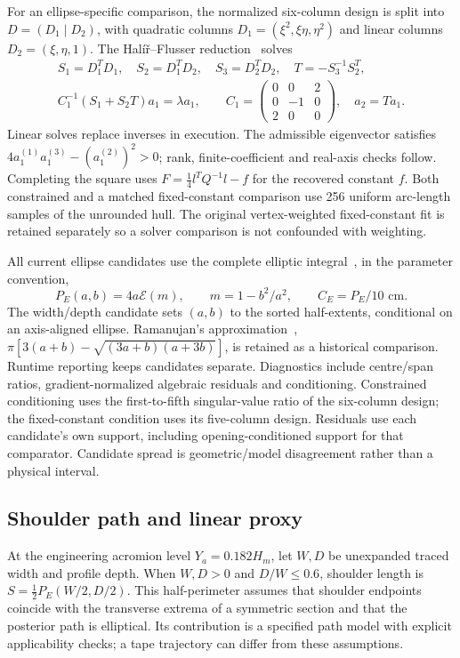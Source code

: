 \documentclass[11pt,a4paper]{article}
\begin{document}
For an ellipse-specific comparison, the normalized six-column design is split into $D=(D_1\mid D_2)$, with quadratic columns $D_1=(\xi^2,\xi\eta,\eta^2)$ and linear columns $D_2=(\xi,\eta,1)$. The Hal\'i\v r--Flusser reduction~\cite{halir1998} solves
\begin{equation}
\begin{gathered}
 S_1=D_1^TD_1,\quad S_2=D_1^TD_2,\quad S_3=D_2^TD_2,\quad
 T=-S_3^{-1}S_2^T,\\
 C_1^{-1}(S_1+S_2T)a_1=\lambda a_1,\qquad
 C_1=\begin{pmatrix}0&0&2\\0&-1&0\\2&0&0\end{pmatrix},\quad a_2=Ta_1.
\end{gathered}
\label{eq:constrained}
\end{equation}
Linear solves replace inverses in execution. The admissible eigenvector satisfies $4a_1^{(1)}a_1^{(3)}-(a_1^{(2)})^2>0$; rank, finite-coefficient and real-axis checks follow. Completing the square uses $F=\tfrac14l^TQ^{-1}l-f$ for the recovered constant $f$. Both constrained and a matched fixed-constant comparison use 256 uniform arc-length samples of the unrounded hull. The original vertex-weighted fixed-constant fit is retained separately so a solver comparison is not confounded with weighting.

All current ellipse candidates use the complete elliptic integral~\cite{dlmfelliptic}, in the parameter convention,
\begin{equation}
 P_E(a,b)=4a\mathcal E(m),\qquad m=1-b^2/a^2,\qquad C_E=P_E/10\text{ cm}.
 \label{eq:perimeter}
\end{equation}
The width/depth candidate sets $(a,b)$ to the sorted half-extents, conditional on an axis-aligned ellipse. Ramanujan's approximation~\cite{ramanujan1914modular}, $\pi[3(a+b)-\sqrt{(3a+b)(a+3b)}]$, is retained as a historical comparison. Runtime reporting keeps candidates separate. Diagnostics include centre/span ratios, gradient-normalized algebraic residuals and conditioning. Constrained conditioning uses the first-to-fifth singular-value ratio of the six-column design; the fixed-constant condition uses its five-column design. Residuals use each candidate's own support, including opening-conditioned support for that comparator. Candidate spread is geometric/model disagreement rather than a physical interval.

\subsection{Shoulder path and linear proxy}
At the engineering acromion level $Y_a=0.182H_m$, let $W,D$ be unexpanded traced width and profile depth. When $W,D>0$ and $D/W\leq0.6$, shoulder length is $S=\tfrac12P_E(W/2,D/2)$. This half-perimeter assumes that shoulder endpoints coincide with the transverse extrema of a symmetric section and that the posterior path is elliptical. Its contribution is a specified path model with explicit applicability checks; a tape trajectory can differ from these assumptions.
\end{document}
